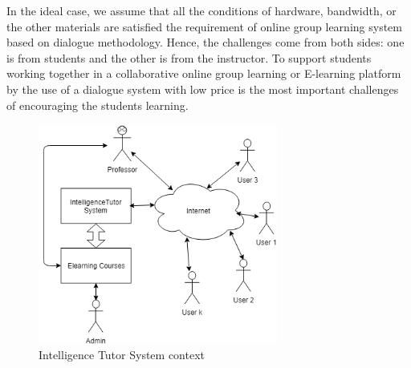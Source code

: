 \documentclass[letterpaper%
, twoside%
, 12pt%
,these%
, english%
,creativecommons,hyperref, withAlgo2e %
]{thETS}
\begin{document}
In the ideal case, we assume that all the conditions of hardware, bandwidth, or the other materials are satisfied the requirement of online group learning system based on dialogue methodology. Hence, the challenges come from both sides: one is from students and the other is from the instructor. To support students working together in a collaborative online group learning or E-learning platform by the use of a dialogue system with low price is the most important challenges of encouraging the students learning.

\begin{figure}
	\includegraphics[width=0.7\textwidth]{Figures/se1.png}
	\caption{Intelligence Tutor System context}
	\label{ITSC}
\end{figure}
\end{document}
